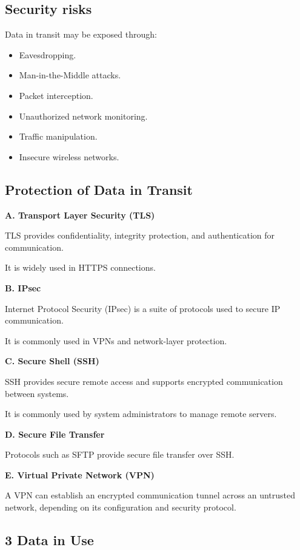 \subsection{Security risks}

Data in transit may be exposed through:

\begin{itemize}
\item Eavesdropping.
\item Man-in-the-Middle attacks.
\item Packet interception.
\item Unauthorized network monitoring.
\item Traffic manipulation.
\item Insecure wireless networks.
\end{itemize}

\subsection{Protection of Data in Transit}

\textbf{A. Transport Layer Security (TLS)}

TLS provides confidentiality, integrity protection, and authentication for communication.

It is widely used in HTTPS connections.

\textbf{B. IPsec}

Internet Protocol Security (IPsec) is a suite of protocols used to secure IP communication.

It is commonly used in VPNs and network-layer protection.

\textbf{C. Secure Shell (SSH)}

SSH provides secure remote access and supports encrypted communication between systems.

It is commonly used by system administrators to manage remote servers.

\textbf{D. Secure File Transfer}

Protocols such as SFTP provide secure file transfer over SSH.

\textbf{E. Virtual Private Network (VPN)}

A VPN can establish an encrypted communication tunnel across an untrusted network, depending on its configuration and security protocol.

\subsection{3 Data in Use}


